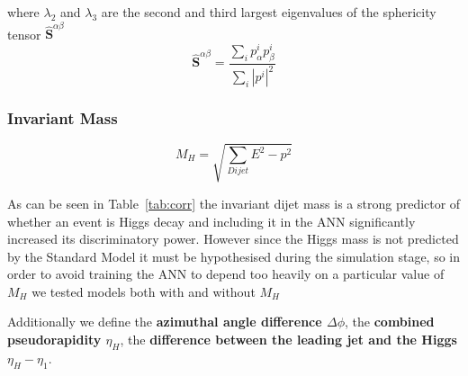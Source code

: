 	where $\lambda_2$ and $\lambda_3$ are the second and third largest eigenvalues of the sphericity tensor $\mathbf{\hat{S}}^{\alpha\beta}$
	\begin{equation}
		\mathbf{\hat{S}}^{\alpha\beta} = \frac{\sum_i p_{\alpha}^i p_{\beta}^i}{\sum_i |p^i|^2}
	\end{equation}


\subsubsection{Invariant Mass} %
\label{ssub:invariant_mass}

\begin{equation}
	M_H = \sqrt{\sum_{Dijet}{E^2 - p^2}}
\end{equation}

As can be seen in Table~\ref{tab:corr} the invariant dijet mass is a strong predictor of whether an event is Higgs decay and including it in the ANN significantly increased its discriminatory power.
However since the Higgs mass is not predicted by the Standard Model it must be hypothesised during the simulation stage, so in order to avoid training the ANN to depend too heavily on a particular value of $M_H$ we tested models both with and without $M_H$


Additionally we define the \textbf{azimuthal angle difference $ \Delta\phi $}, the \textbf{combined pseudorapidity $\eta_H$}, the \textbf{difference between the leading jet and the Higgs $\eta_H - \eta_1$}.

